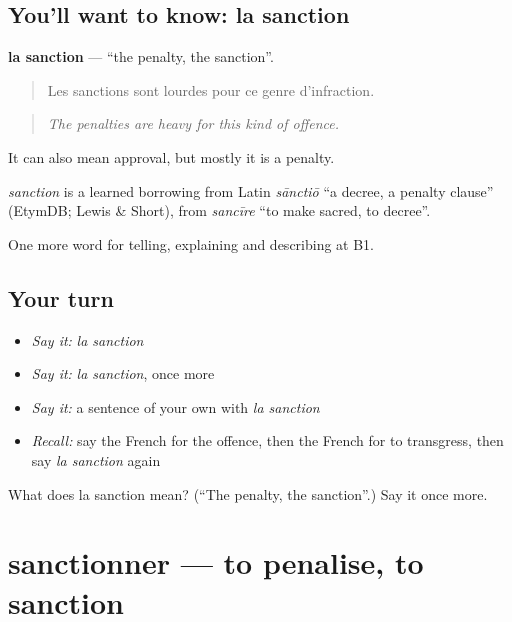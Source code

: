 \subsection*{You'll want to know: la sanction}
\textbf{la sanction} — \textquotedblleft{}the penalty, the sanction\textquotedblright{}.

\begin{quote}
Les sanctions sont lourdes pour ce genre d'infraction.
\end{quote}

\begin{quote}
\emph{The penalties are heavy for this kind of offence.}
\end{quote}

It can also mean approval, but mostly it is a penalty.

\begin{cousinweb}
\emph{sanction} is a learned borrowing from Latin \emph{sānctiō} \textquotedblleft{}a decree, a penalty clause\textquotedblright{} (EtymDB; Lewis \& Short), from \emph{sancīre} \textquotedblleft{}to make sacred, to decree\textquotedblright{}.
\end{cousinweb}

\begin{grammarlens}[title={What you've built}]
One more word for telling, explaining and describing at B1.
\end{grammarlens}

\subsection*{Your turn}
\begin{itemize}
\raggedright
  \item \emph{Say it:} \emph{la sanction}
  \item \emph{Say it:} \emph{la sanction}, once more
  \item \emph{Say it:} a sentence of your own with \emph{la sanction}
  \item \emph{Recall:} say the French for the offence, then the French for to transgress, then say \emph{la sanction} again
\end{itemize}

\begin{tcolorbox}[breakable,colback=teal!4,colframe=teal!35!black,title={Before you move on}]
What does la sanction mean? (\textquotedblleft{}The penalty, the sanction\textquotedblright{}.) Say it once more.
\end{tcolorbox}
\section[sanctionner]{sanctionner — to penalise, to sanction}

